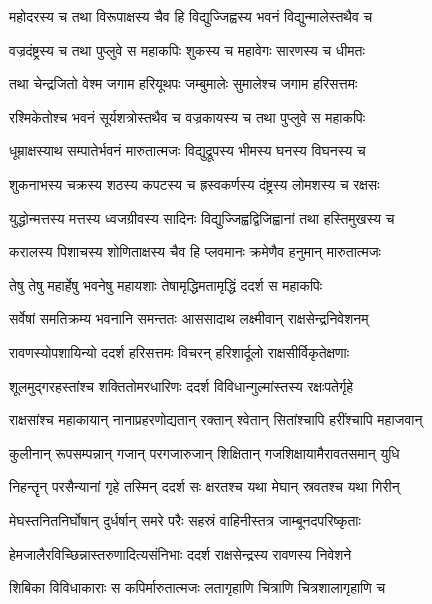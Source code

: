 \twolineshloka
{महोदरस्य च तथा विरूपाक्षस्य चैव हि}
{विद्युज्जिह्वस्य भवनं विद्युन्मालेस्तथैव च} %

\twolineshloka
{वज्रदंष्ट्रस्य च तथा पुप्लुवे स महाकपिः}
{शुकस्य च महावेगः सारणस्य च धीमतः} %

\twolineshloka
{तथा चेन्द्रजितो वेश्म जगाम हरियूथपः}
{जम्बुमालेः सुमालेश्च जगाम हरिसत्तमः} %

\twolineshloka
{रश्मिकेतोश्च भवनं सूर्यशत्रोस्तथैव च}
{वज्रकायस्य च तथा पुप्लुवे स महाकपिः} %

\twolineshloka
{धूम्राक्षस्याथ सम्पातेर्भवनं मारुतात्मजः}
{विद्युद्रूपस्य भीमस्य घनस्य विघनस्य च} %

\twolineshloka
{शुकनाभस्य चक्रस्य शठस्य कपटस्य च}
{ह्रस्वकर्णस्य दंष्ट्रस्य लोमशस्य च रक्षसः} %

\twolineshloka
{युद्धोन्मत्तस्य मत्तस्य ध्वजग्रीवस्य सादिनः}
{विद्युज्जिह्वद्विजिह्वानां तथा हस्तिमुखस्य च} %

\twolineshloka
{करालस्य पिशाचस्य शोणिताक्षस्य चैव हि}
{प्लवमानः क्रमेणैव हनुमान् मारुतात्मजः} %

\twolineshloka
{तेषु तेषु महार्हेषु भवनेषु महायशाः}
{तेषामृद्धिमतामृद्धिं ददर्श स महाकपिः} %

\twolineshloka
{सर्वेषां समतिक्रम्य भवनानि समन्ततः}
{आससादाथ लक्ष्मीवान् राक्षसेन्द्रनिवेशनम्} %

\twolineshloka
{रावणस्योपशायिन्यो ददर्श हरिसत्तमः}
{विचरन् हरिशार्दूलो राक्षसीर्विकृतेक्षणाः} %

\twolineshloka
{शूलमुद्गरहस्तांश्च शक्तितोमरधारिणः}
{ददर्श विविधान्गुल्मांस्तस्य रक्षःपतेर्गृहे} %

\twolineshloka
{राक्षसांश्च महाकायान् नानाप्रहरणोद्यतान्}
{रक्तान् श्वेतान् सितांश्चापि हरींश्चापि महाजवान्} %

\twolineshloka
{कुलीनान् रूपसम्पन्नान् गजान् परगजारुजान्}
{शिक्षितान् गजशिक्षायामैरावतसमान् युधि} %

\twolineshloka
{निहन्तॄन् परसैन्यानां गृहे तस्मिन् ददर्श सः}
{क्षरतश्च यथा मेघान् स्रवतश्च यथा गिरीन्} %

\twolineshloka
{मेघस्तनितनिर्घोषान् दुर्धर्षान् समरे परैः}
{सहस्रं वाहिनीस्तत्र जाम्बूनदपरिष्कृताः} %

\twolineshloka
{हेमजालैरविच्छिन्नास्तरुणादित्यसंनिभाः}
{ददर्श राक्षसेन्द्रस्य रावणस्य निवेशने} %

\twolineshloka
{शिबिका विविधाकाराः स कपिर्मारुतात्मजः}
{लतागृहाणि चित्राणि चित्रशालागृहाणि च} %

